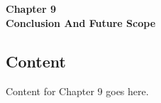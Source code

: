 
\titleformat{\chapter}[block]{\normalfont}{}{0pt}{}
\titlespacing{\chapter}{0pt}{-2em}{0pt}
\chapter[Conclusion And Future Scope]{}
\vspace*{\fill}
\begin{center}
\textbf{\Huge{Chapter 9}}\\
\vspace{5mm}
\textbf{\Huge{Conclusion And Future Scope}}
\end{center}
\vspace*{\fill}
\newpage

\titleformat{\chapter}[display]{\vspace{1cm}\normalfont\Large\bfseries\centering}{\chaptertitlename\ \thechapter}{20pt}{\vspace{0pt}}
\titlespacing*{\chapter}{0pt}{-50pt}{20pt}

\section{Content}
\justify

Content for Chapter 9 goes here.

